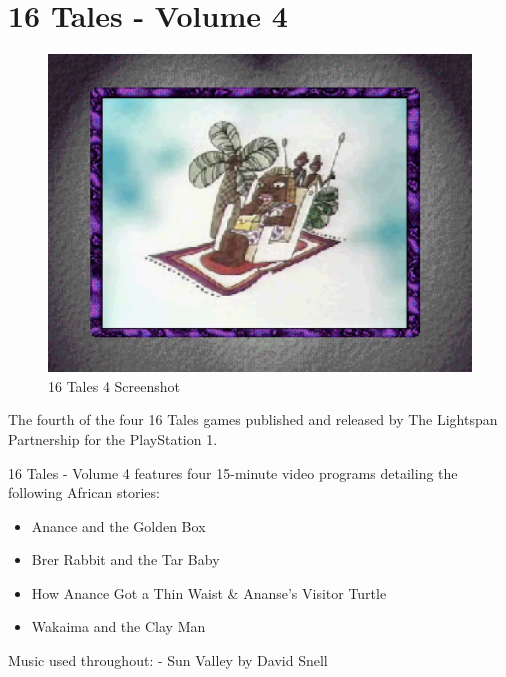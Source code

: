 \chapter{16 Tales - Volume 4}

\begin{figure}[H]
    \centering
    \includegraphics[width=\textwidth/2]{"./Games/16Tales/Images/16Tales4Screenshot.png"}
    \caption{16 Tales 4 Screenshot}
\end{figure}

The fourth of the four 16 Tales games published and released by The Lightspan Partnership for the PlayStation 1.

16 Tales - Volume 4 features four 15-minute video programs detailing the following African stories:

\begin{itemize}
    \item Anance and the Golden Box
    \item Brer Rabbit and the Tar Baby
    \item How Anance Got a Thin Waist \& Ananse's Visitor Turtle
    \item Wakaima and the Clay Man
\end{itemize}

Music used throughout:
- Sun Valley by David Snell

